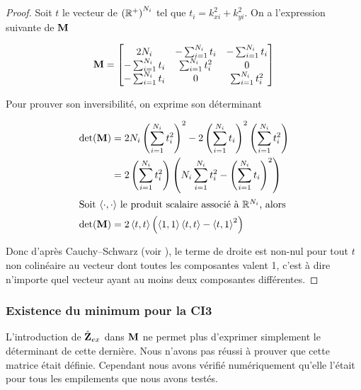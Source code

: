       \begin{proof}
        Soit \(t\) le vecteur de \(\left(\mathbb R^+\right)^{N_{i}}\) tel que \(t_i = k_{xi}^2 + k_{yi}^2\). On a l'expression suivante de \({\mathbf{M}}\)

        \begin{equation}
          {\mathbf{M}} = \begin{bmatrix}
          2 N_{i} & -\sum_{i=1}^{N_{i}} t_i & -\sum_{i=1}^{N_{i}} t_i
          \\
          -\sum_{i=1}^{N_{i}} t_i & \sum_{i=1}^{N_{i}} t_i^2 & 0
          \\
          -\sum_{i=1}^{N_{i}} t_i & 0 & \sum_{i=1}^{N_{i}} t_i^2
          \end{bmatrix}
        \end{equation}

        Pour prouver son inversibilité, on exprime son déterminant 

        \begin{align}
          \det( {\mathbf{M}}) &= 2N_{i}\left(\sum_{i=1}^{N_{i}} t_i^2\right)^2 - 2 \left( \sum_{i=1}^{N_{i}} t_i\right)^2 \left(\sum_{i=1}^{N_{i}}t_i^2\right) 
          \\
          &= 2\left(\sum_{i=1}^{N_{i}} t_i^2\right)\left(N_{i}\sum_{i=1}^{N_{i}} t_i^2 - \left( \sum_{i=1}^{N_{i}} t_i\right)^2 \right)
          \\
          \intertext{Soit \(\left<\cdot,\cdot\right>\) le produit scalaire associé à \(\mathbb R^{N_{i}}\), alors}
          \det( {\mathbf{M}}) &= 2\left<t,t\right>\left( \left<1,1\right>\left<t,t\right>- \left<t,1\right>^2\right)
        \end{align}

        Donc d'après Cauchy–Schwarz (voir \cite[\href{https://dlmf.nist.gov/1.7\#E1}{eq.~1.7.1}]{dlmf_nist_2019}), le terme de droite est non-nul pour tout \(t\) non colinéaire au vecteur dont toutes les composantes valent 1, c'est à dire n'importe quel vecteur ayant au moins deux composantes différentes.
      \end{proof}

      \subsubsection{Existence du minimum pour la CI3}

        L'introduction de \(\hat{\mathbf{Z}}_{ex}\) dans \(\mathbf{M}\) ne permet plus d'exprimer simplement le déterminant de cette dernière. Nous n'avons pas réussi à prouver que cette matrice était définie. Cependant nous avons vérifié numériquement qu'elle l'était pour tous les empilements que nous avons testés.

